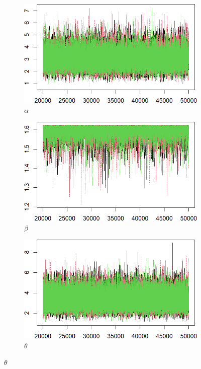 \documentclass{Class/julia}
\begin{document}
\begin{figure}[!ht]
    \centering
    \caption{Trace Plots}
    \label{fig:4}
    \begin{subfigure}{0.45\textwidth}
        \centering
        \includegraphics[width=\textwidth]{rytgaard1990/trace_alpha.png}
        \caption{\( \alpha \)}
    \end{subfigure}
    \hfill
    \begin{subfigure}{0.45\textwidth}
        \centering
        \includegraphics[width=\textwidth]{rytgaard1990/trace_beta.png}
        \caption{\( \beta \)}
    \end{subfigure}

    \vspace{1em}

    \begin{subfigure}{0.45\textwidth}
        \centering
        \includegraphics[width=\textwidth]{rytgaard1990/trace_theta.png}
        \caption{\( \theta \)}
    \end{subfigure}

\end{figure}
\end{document}
